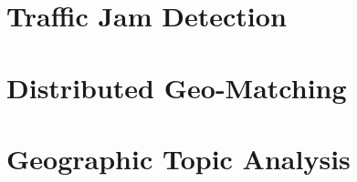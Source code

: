 \documentclass[external]{20120615_deliverable_template_ukob}
\theoremstyle{definition}
\begin{document}
\clearpage
\section{Traffic Jam Detection}
\label{sec:TJD}


\clearpage
\section{Distributed Geo-Matching}
\label{sec:DGM}


\clearpage
\section{Geographic Topic Analysis}
\label{sec:GTA}


\clearpage

\end{document}
